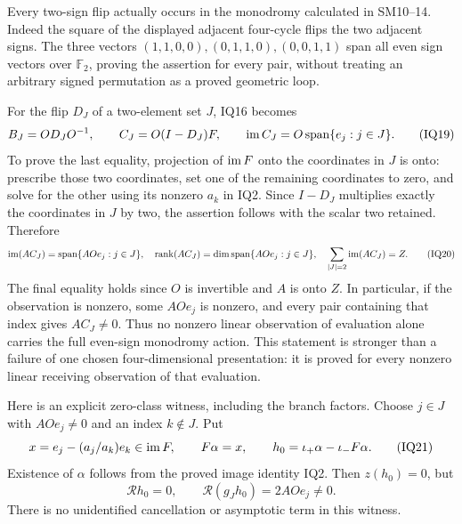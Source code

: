 \documentclass[11pt]{article}
\begin{document}
Every two-sign flip actually occurs in the monodromy calculated in
SM10--14.  Indeed the square of the displayed adjacent four-cycle flips
the two adjacent signs.  The three vectors $(1,1,0,0),(0,1,1,0),(0,0,1,1)$
span all even sign vectors over $\mathbb F_2$, proving the assertion for
every pair, without treating an arbitrary signed permutation as a proved
geometric loop.

For the flip $D_J$ of a two-element set $J$, IQ16 becomes
\[
 B_J=OD_JO^{-1},\qquad
 C_J=O(I-D_J)F,
 \qquad \operatorname{im} C_J=O\operatorname{span}\{e_j:j\in J\}.              \tag{IQ19}
\]
To prove the last equality, projection of $\operatorname{im} F$ onto the coordinates in
$J$ is onto: prescribe those two coordinates, set one of the remaining
coordinates to zero, and solve for the other using its nonzero $a_k$ in
IQ2.  Since $I-D_J$ multiplies exactly the coordinates in $J$ by two,
the assertion follows with the scalar two retained.  Therefore
\[
 \operatorname{im}(AC_J)=\operatorname{span}\{AOe_j:j\in J\},\quad
 \operatorname{rank}(AC_J)=\dim\operatorname{span}\{AOe_j:j\in J\},\quad
 \sum_{|J|=2}\operatorname{im}(AC_J)=Z.                            \tag{IQ20}
\]
The final equality holds since $O$ is invertible and $A$ is onto $Z$.
In particular, if the observation is nonzero, some $AOe_j$ is nonzero,
and every pair containing that index gives $AC_J\ne0$.  Thus no nonzero
linear observation of evaluation alone carries the full even-sign
monodromy action.  This statement is stronger than a failure of one
chosen four-dimensional presentation: it is proved for every nonzero
linear receiving observation of that evaluation.

Here is an explicit zero-class witness, including the branch factors.
Choose $j\in J$ with $AOe_j\ne0$ and an index $k\notin J$.  Put
\[
 x=e_j-(a_j/a_k)e_k\in\operatorname{im} F,\qquad
 F\alpha=x,\qquad
 h_0=\iota_+\alpha-\iota_-F\alpha.                 \tag{IQ21}
\]
Existence of $\alpha$ follows from the proved image identity IQ2.
Then $z(h_0)=0$, but
\[
 \mathcal Rh_0=0,\qquad
 \mathcal R(g_Jh_0)=2AOe_j\ne0.                    \tag{IQ22}
\]
There is no unidentified cancellation or asymptotic term in this witness.
\end{document}
